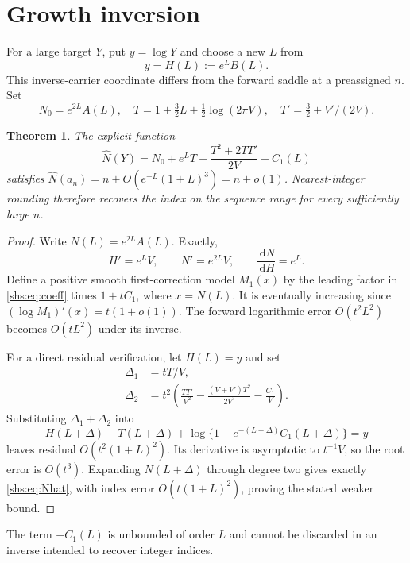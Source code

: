\documentclass[11pt]{article}
\newtheorem{theorem}{Theorem}[section]
\newcommand{\dd}{\,\mathrm{d}}
\theoremstyle{definition}
\theoremstyle{plain}
\begin{document}
\section{Growth inversion}\label{shs:sec:inverse}
For a large target $Y$, put $y=\log Y$ and choose a new $L$ from
\begin{equation}\label{shs:eq:carrier}
 y=H(L):=e^LB(L).
\end{equation}
This inverse-carrier coordinate differs from the forward saddle at a
preassigned $n$. Set
\[
 N_0=e^{2L}A(L),\quad T=1+\tfrac32L+\tfrac12\log(2\pi V),\quad
 T'=\tfrac32+V'/(2V).
\]
\begin{theorem}\label{shs:thm:inverse}
The explicit function
\begin{equation}\label{shs:eq:Nhat}
 \widehat N(Y)=N_0+e^LT+\frac{T^2+2TT'}{2V}-C_1(L)
\end{equation}
satisfies
$\widehat N(a_n)=n+O(e^{-L}(1+L)^3)=n+o(1)$.
Nearest-integer rounding therefore recovers the index on the sequence
range for every sufficiently large $n$.
\end{theorem}
\begin{proof}
Write $N(L)=e^{2L}A(L)$. Exactly,
\begin{equation}\label{shs:eq:derivs}
 H'=e^LV,\qquad N'=e^{2L}V,\qquad \frac{\dd N}{\dd H}=e^L.
\end{equation}
Define a positive smooth first-correction model $M_1(x)$ by the leading
factor in \eqref{shs:eq:coeff} times $1+tC_1$, where $x=N(L)$.
It is eventually increasing since $(\log M_1)'(x)=t(1+o(1))$.
The forward logarithmic error $O(t^2L^2)$ becomes $O(tL^2)$ under its
inverse.

For a direct residual verification, let $H(L)=y$ and set
\begin{align*}
 \Delta_1&=tT/V,\\
 \Delta_2&=t^2\left(\frac{TT'}{V^2}
 -\frac{(V+V')T^2}{2V^3}-\frac{C_1}{V}\right).
\end{align*}
Substituting $\Delta_1+\Delta_2$ into
\[
 H(L+\Delta)-T(L+\Delta)
 +\log\{1+e^{-(L+\Delta)}C_1(L+\Delta)\}=y
\]
leaves residual $O(t^2(1+L)^2)$. Its derivative is asymptotic to
$t^{-1}V$, so the root error is $O(t^3)$. Expanding $N(L+\Delta)$ through
degree two gives exactly \eqref{shs:eq:Nhat}, with index error
$O(t(1+L)^2)$, proving the stated weaker bound.
\end{proof}
The term $-C_1(L)$ is unbounded of order $L$ and cannot be discarded in
an inverse intended to recover integer indices.
\end{document}
